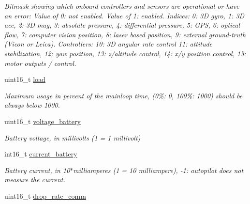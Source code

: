 \begin{DoxyCompactItemize}
\begin{DoxyCompactList}\small\item\em Bitmask showing which onboard controllers and sensors are operational or have an error\+: Value of 0\+: not enabled. Value of 1\+: enabled. Indices\+: 0\+: 3\+D gyro, 1\+: 3\+D acc, 2\+: 3\+D mag, 3\+: absolute pressure, 4\+: differential pressure, 5\+: G\+P\+S, 6\+: optical flow, 7\+: computer vision position, 8\+: laser based position, 9\+: external ground-\/truth (Vicon or Leica). Controllers\+: 10\+: 3\+D angular rate control 11\+: attitude stabilization, 12\+: yaw position, 13\+: z/altitude control, 14\+: x/y position control, 15\+: motor outputs / control. \end{DoxyCompactList}\item 
\hypertarget{struct____mavlink__sys__status__t_a2c25af241ac32995f2194d53dcaaf3e2}{uint16\+\_\+t \hyperlink{struct____mavlink__sys__status__t_a2c25af241ac32995f2194d53dcaaf3e2}{load}}\label{struct____mavlink__sys__status__t_a2c25af241ac32995f2194d53dcaaf3e2}

\begin{DoxyCompactList}\small\item\em Maximum usage in percent of the mainloop time, (0\%\+: 0, 100\%\+: 1000) should be always below 1000. \end{DoxyCompactList}\item 
\hypertarget{struct____mavlink__sys__status__t_a47f55c2ec3aeb48c924092e2a46ffc99}{uint16\+\_\+t \hyperlink{struct____mavlink__sys__status__t_a47f55c2ec3aeb48c924092e2a46ffc99}{voltage\+\_\+battery}}\label{struct____mavlink__sys__status__t_a47f55c2ec3aeb48c924092e2a46ffc99}

\begin{DoxyCompactList}\small\item\em Battery voltage, in millivolts (1 = 1 millivolt) \end{DoxyCompactList}\item 
\hypertarget{struct____mavlink__sys__status__t_a78ab5021909544c255827e8b2bd23034}{int16\+\_\+t \hyperlink{struct____mavlink__sys__status__t_a78ab5021909544c255827e8b2bd23034}{current\+\_\+battery}}\label{struct____mavlink__sys__status__t_a78ab5021909544c255827e8b2bd23034}

\begin{DoxyCompactList}\small\item\em Battery current, in 10$\ast$milliamperes (1 = 10 milliampere), -\/1\+: autopilot does not measure the current. \end{DoxyCompactList}\item 
\hypertarget{struct____mavlink__sys__status__t_a08c165a0dcb2a852605e8abaaf9dfd78}{uint16\+\_\+t \hyperlink{struct____mavlink__sys__status__t_a08c165a0dcb2a852605e8abaaf9dfd78}{drop\+\_\+rate\+\_\+comm}}\label{struct____mavlink__sys__status__t_a08c165a0dcb2a852605e8abaaf9dfd78}


\end{DoxyCompactItemize}
